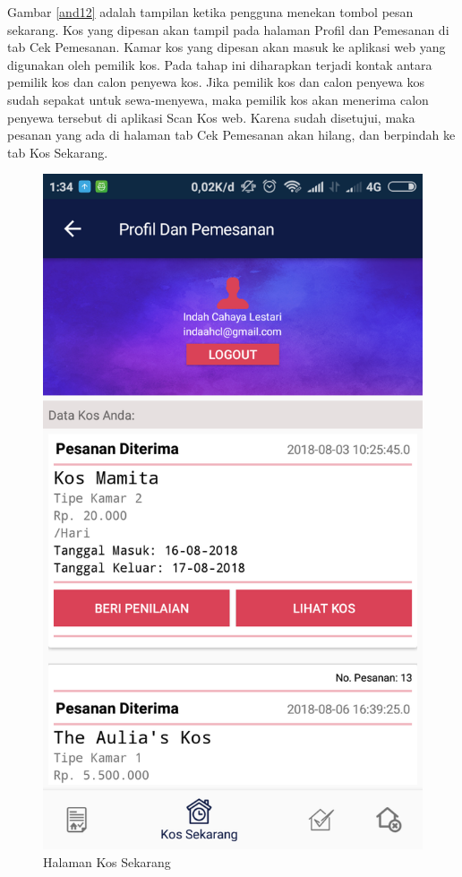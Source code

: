 		Gambar \ref{and12} adalah tampilan ketika pengguna menekan tombol pesan sekarang. Kos yang dipesan akan tampil pada halaman Profil dan Pemesanan di tab Cek Pemesanan. Kamar kos yang dipesan akan masuk ke aplikasi web yang digunakan oleh pemilik kos. Pada tahap ini diharapkan terjadi kontak antara pemilik kos dan calon penyewa kos. Jika pemilik kos dan calon penyewa kos sudah sepakat untuk sewa-menyewa, maka pemilik kos akan menerima calon penyewa tersebut di aplikasi Scan Kos web. Karena sudah disetujui, maka pesanan yang ada di halaman tab Cek Pemesanan akan hilang, dan berpindah ke tab Kos Sekarang. 
		
		\begin{figure}[H]
			\centering
			\includegraphics[scale=0.25]{gambar/and/18}
			\caption{Halaman Kos Sekarang}
			\label{and13}
		\end{figure}
	
